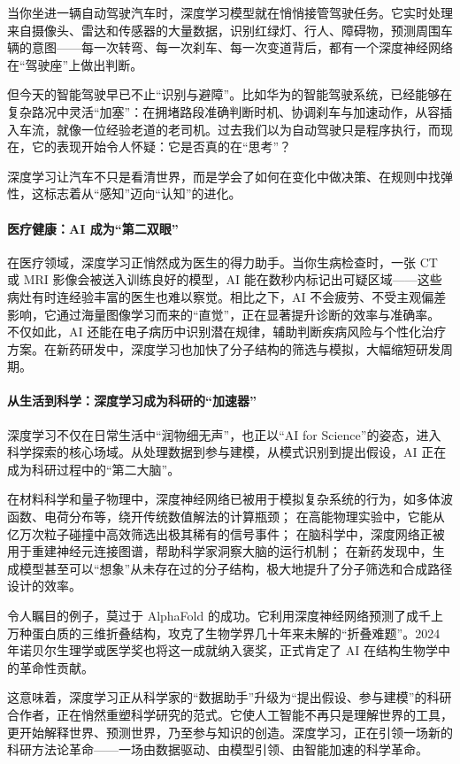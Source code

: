 当你坐进一辆自动驾驶汽车时，深度学习模型就在悄悄接管驾驶任务。它实时处理来自摄像头、雷达和传感器的大量数据，识别红绿灯、行人、障碍物，预测周围车辆的意图——每一次转弯、每一次刹车、每一次变道背后，都有一个深度神经网络在“驾驶座”上做出判断。

但今天的智能驾驶早已不止“识别与避障”。比如华为的智能驾驶系统，已经能够在复杂路况中灵活“加塞”：在拥堵路段准确判断时机、协调刹车与加速动作，从容插入车流，就像一位经验老道的老司机。过去我们以为自动驾驶只是程序执行，而现在，它的表现开始令人怀疑：它是否真的在“思考”？

深度学习让汽车不只是看清世界，而是学会了如何在变化中做决策、在规则中找弹性，这标志着从“感知”迈向“认知”的进化。
    
\paragraph{医疗健康：AI 成为“第二双眼”}
    
在医疗领域，深度学习正悄然成为医生的得力助手。当你生病检查时，一张 CT 或 MRI 影像会被送入训练良好的模型，AI 能在数秒内标记出可疑区域——这些病灶有时连经验丰富的医生也难以察觉。相比之下，AI 不会疲劳、不受主观偏差影响，它通过海量图像学习而来的“直觉”，正在显著提升诊断的效率与准确率。
不仅如此，AI 还能在电子病历中识别潜在规律，辅助判断疾病风险与个性化治疗方案。在新药研发中，深度学习也加快了分子结构的筛选与模拟，大幅缩短研发周期。

\paragraph{从生活到科学：深度学习成为科研的“加速器”}  
深度学习不仅在日常生活中“润物细无声”，也正以“AI for Science”的姿态，进入科学探索的核心场域。从处理数据到参与建模，从模式识别到提出假设，AI 正在成为科研过程中的“第二大脑”。

在材料科学和量子物理中，深度神经网络已被用于模拟复杂系统的行为，如多体波函数、电荷分布等，绕开传统数值解法的计算瓶颈；
在高能物理实验中，它能从亿万次粒子碰撞中高效筛选出极其稀有的信号事件；
在脑科学中，深度网络正被用于重建神经元连接图谱，帮助科学家洞察大脑的运行机制；
在新药发现中，生成模型甚至可以“想象”从未存在过的分子结构，极大地提升了分子筛选和合成路径设计的效率。

令人瞩目的例子，莫过于 AlphaFold 的成功。它利用深度神经网络预测了成千上万种蛋白质的三维折叠结构，攻克了生物学界几十年来未解的“折叠难题”。2024 年诺贝尔生理学或医学奖也将这一成就纳入褒奖，正式肯定了 AI 在结构生物学中的革命性贡献。

这意味着，深度学习正从科学家的“数据助手”升级为“提出假设、参与建模”的科研合作者，正在悄然重塑科学研究的范式。它使人工智能不再只是理解世界的工具，更开始解释世界、预测世界，乃至参与知识的创造。深度学习，正在引领一场新的科研方法论革命——一场由数据驱动、由模型引领、由智能加速的科学革命。

